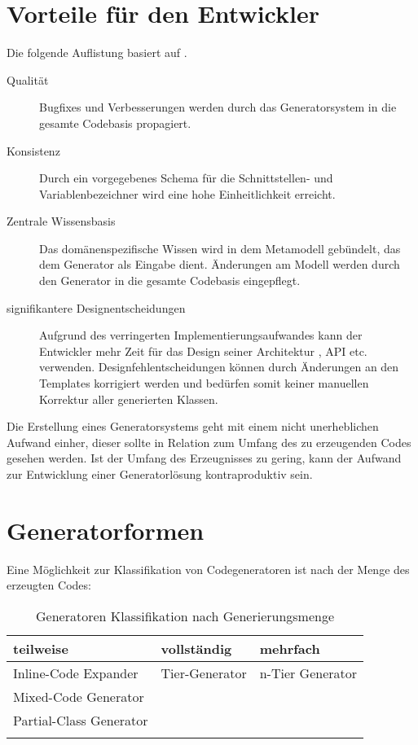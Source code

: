 \section{Vorteile für den Entwickler}

Die folgende Auflistung basiert auf \cite[][S. 15]{czarnecki2000generative}.

\begin{description}
    \item[Qualität]
        Bugfixes und Verbesserungen werden durch das Generatorsystem in die gesamte Codebasis propagiert.
    \item[Konsistenz]
        Durch ein vorgegebenes Schema für die Schnittstellen- und Variablenbezeichner wird eine hohe Einheitlichkeit erreicht.
    \item[Zentrale Wissensbasis]
        Das domänenspezifische Wissen wird in dem Metamodell gebündelt, das dem Generator als Eingabe dient. Änderungen am Modell werden durch den Generator in die gesamte Codebasis eingepflegt.
    \item[signifikantere Designentscheidungen]
        Aufgrund des verringerten Implementierungsaufwandes kann der Entwickler mehr Zeit für das Design seiner Architektur , API etc. verwenden. Designfehlentscheidungen können durch Änderungen an den Templates korrigiert werden und bedürfen somit keiner manuellen Korrektur aller generierten Klassen.
\end{description}

Die Erstellung eines Generatorsystems geht mit einem nicht unerheblichen Aufwand einher, dieser sollte in Relation zum Umfang des zu erzeugenden Codes gesehen werden.
Ist der Umfang des Erzeugnisses zu gering, kann der Aufwand zur Entwicklung einer Generatorlösung kontraproduktiv sein.

\section{Generatorformen}

Eine Möglichkeit zur Klassifikation von Codegeneratoren ist nach der Menge des erzeugten Codes:

\begin{minipage}{\textwidth}
    \begin{longtable}[htb]{l l l}
        \toprule
        \rowcolor{lightgray}
        \textbf{teilweise}   & \textbf{vollständig}     & \textbf{mehrfach}\\
        \midrule
        Inline-Code Expander    & Tier-Generator    & n-Tier Generator\\
        Mixed-Code Generator & &\\
        Partial-Class Generator & & \\
        \bottomrule
        \caption{Generatoren Klassifikation nach Generierungsmenge}
        \label{tab:generatorclassification}
    \end{longtable} 
\end{minipage}

